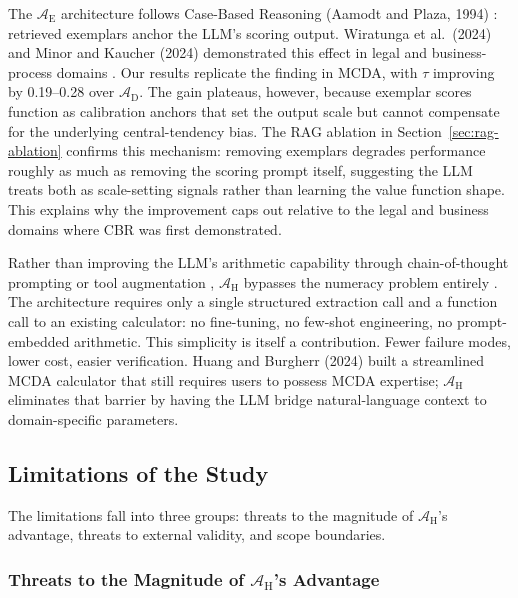 \documentclass[final,3p,times]{elsarticle}
\begin{document}
The $\mathcal{A}_{\text{E}}$ architecture follows Case-Based Reasoning (Aamodt and Plaza, 1994) \cite{aamodtplaza1994}: retrieved exemplars anchor the LLM's scoring output. Wiratunga et al.\ (2024) and Minor and Kaucher (2024) demonstrated this effect in legal and business-process domains \cite{wiratunga2024cbrrag,minorkaucher2024}. Our results replicate the finding in MCDA, with $\tau$ improving by 0.19--0.28 over $\mathcal{A}_{\text{D}}$. The gain plateaus, however, because exemplar scores function as calibration anchors that set the output scale but cannot compensate for the underlying central-tendency bias. The RAG ablation in Section~\ref{sec:rag-ablation} confirms this mechanism: removing exemplars degrades performance roughly as much as removing the scoring prompt itself, suggesting the LLM treats both as scale-setting signals rather than learning the value function shape. This explains why the improvement caps out relative to the legal and business domains where CBR was first demonstrated.

Rather than improving the LLM's arithmetic capability through chain-of-thought prompting or tool augmentation \cite{schick2023toolformer,gao2023pal}, $\mathcal{A}_{\text{H}}$ bypasses the numeracy problem entirely \cite{cobbe2021gsm8k,imani2023mathprompter}. The architecture requires only a single structured extraction call and a function call to an existing calculator: no fine-tuning, no few-shot engineering, no prompt-embedded arithmetic. This simplicity is itself a contribution. Fewer failure modes, lower cost, easier verification. Huang and Burgherr (2024) built a streamlined MCDA calculator that still requires users to possess MCDA expertise; $\mathcal{A}_{\text{H}}$ eliminates that barrier by having the LLM bridge natural-language context to domain-specific parameters.

\subsection{Limitations of the Study}
\label{sec:limitations}

The limitations fall into three groups: threats to the magnitude of $\mathcal{A}_{\text{H}}$'s advantage, threats to external validity, and scope boundaries.

\subsubsection{Threats to the Magnitude of $\mathcal{A}_{\text{H}}$'s Advantage}
\end{document}
